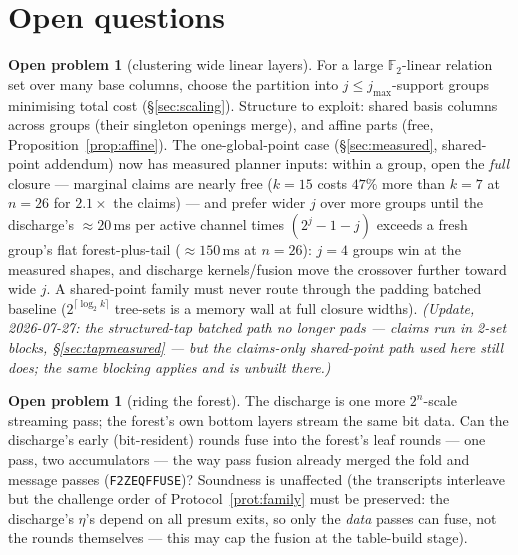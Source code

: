 \documentclass[11pt]{article}
\newcommand{\F}{\mathbb{F}}
\newcommand{\Ftwo}{\F_2}
\DeclareRobustCommand{\code}[1]{{\def\_{\textunderscore\allowbreak}\texttt{#1}}}
\theoremstyle{plain}
\theoremstyle{definition}
\newtheorem{openproblem}[theorem]{Open problem}
\theoremstyle{remark}
\begin{document}
\section{Open questions}\label{sec:open}

\begin{openproblem}[clustering wide linear layers]
For a large $\Ftwo$-linear relation set over many base columns, choose the
partition into $j\le j_{\max}$-support groups minimising total cost
(\S\ref{sec:scaling}). Structure to exploit: shared basis columns across
groups (their singleton openings merge), and affine parts (free,
Proposition~\ref{prop:affine}). The one-global-point case
(\S\ref{sec:measured}, shared-point addendum) now has measured planner
inputs: within a group, open the \emph{full} closure --- marginal claims
are nearly free ($k{=}15$ costs $47\%$ more than $k{=}7$ at $n{=}26$ for
$2.1\times$ the claims) --- and prefer wider $j$ over more groups until
the discharge's ${\approx}20$\,ms per active channel times
$(2^{j}{-}1{-}j)$ exceeds a fresh group's flat forest-plus-tail
(${\approx}150$\,ms at $n{=}26$): $j=4$ groups win at the measured
shapes, and discharge kernels/fusion move the crossover further toward
wide $j$. A shared-point family must never route through the padding
batched baseline ($2^{\lceil\log_2 k\rceil}$ tree-sets is a memory wall
at full closure widths). \emph{(Update, 2026-07-27: the
structured-tap batched path no longer pads --- claims run in 2-set
blocks, \S\ref{sec:tapmeasured} --- but the claims-only shared-point
path used here still does; the same blocking applies and is
unbuilt there.)}
\end{openproblem}

\begin{openproblem}[riding the forest]
The discharge is one more $2^{n}$-scale streaming pass; the forest's own
bottom layers stream the same bit data. Can the discharge's early
(bit-resident) rounds fuse into the forest's leaf rounds --- one pass, two
accumulators --- the way pass fusion already merged the fold and message
passes (\code{F2Z\_EQF\_FUSE})? Sound\-ness is unaffected (the transcripts
interleave but the challenge order of Protocol~\ref{prot:family} must be
preserved: the discharge's $\eta$'s depend on all presum exits, so only the
\emph{data} passes can fuse, not the rounds themselves --- this may cap the
fusion at the table-build stage).
\end{openproblem}
\end{document}
